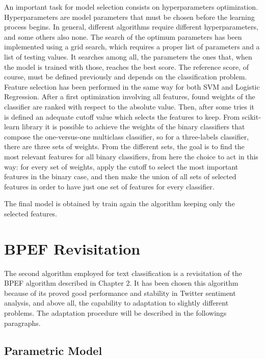 An important task for model selection consists on hyperparameters optimization. Hyperparameters are model parameters that must be chosen before the learning process begins. In general, different algorithms require different hyperparameters, and some others also none. The search of the optimum parameters has been implemented using a grid search, which requires a proper list of parameters and a list of testing values. It searches among all, the parameters the ones that, when the model is trained with those, reaches the best score. The reference score, of course, must be defined previously and depends on the classification problem.
Feature selection has been performed in the same way for both SVM and Logistic Regression. After a first optimization involving all features, found weights of the classifier are ranked with respect to the absolute value. Then, after some tries it is defined an adequate cutoff value which selects the features to keep. From scikit-learn library it is possible to achieve the weights of the binary classifiers that compose the one-versus-one multiclass classifier, so for a three-labels classifier, there are three sets of weights. From the different sets, the goal is to find the most relevant features for all binary classifiers, from here the choice to act in this way: for every set of weights, apply the cutoff to select the most important features in the binary case, and then make the union of all sets of selected features in order to have just one set of features for every classifier.



 The final model is obtained by train again the algorithm keeping only the selected features.


\section{BPEF Revisitation}

The second algorithm employed for text classification is a revisitation of the BPEF algorithm described in Chapter 2. It has been chosen this algorithm because of its proved good performance and stability in Twitter sentiment analysis, and above all, the capability to adaptation to slightly different problems. The adaptation procedure will be described in the followings paragraphs.

\subsection{Parametric Model}

